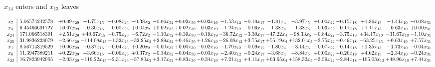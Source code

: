 \documentclass[9pt]{article}
\begin{document}
 $ x_{14} $ enters and $ x_{13} $ leaves 

 \[\begin{array}{c| c c@{\hskip 2pt} c@{\hskip 2pt} c@{\hskip 2pt} c@{\hskip 2pt} c@{\hskip 2pt} c@{\hskip 2pt} c@{\hskip 2pt} c@{\hskip 2pt} c@{\hskip 2pt} c@{\hskip 2pt} c@{\hskip 2pt} c@{\hskip 2pt} c@{\hskip 2pt} c@{\hskip 2pt} c@{\hskip 2pt} c@{\hskip 2pt} }
 x_{7}   &  5.06574242578 & +  0.09 x_{29} & +  1.75 x_{15} & -0.08 x_{26} & -0.38 x_{2} & -0.06 x_{32} & +  0.02 x_{30} & +  0.02 x_{19} & -1.53 x_{12} & -0.10 x_{17} & -1.81 x_{4} & -3.97 x_{5} & +  0.00 x_{22} & -0.15 x_{18} & +  1.86 x_{13} & -1.44 x_{10} & -0.08 x_{31}\\
 x_{3}   &  6.45466691727 & +  0.07 x_{29} & +  0.30 x_{15} & -0.00 x_{26} & +  0.04 x_{2} & +  0.02 x_{32} & +  0.02 x_{30} & -0.03 x_{19} & -1.24 x_{12} & -0.06 x_{17} & -1.38 x_{4} & -1.38 x_{5} & -0.03 x_{22} & -0.11 x_{18} & +  1.11 x_{13} & -0.63 x_{10} & +  0.00 x_{31}\\
 x_{24}   &  171.066518301 & +  2.51 x_{29} & + 40.67 x_{15} & -0.75 x_{26} & -6.72 x_{2} & -1.10 x_{32} & +  0.39 x_{30} & -0.19 x_{19} & -36.72 x_{12} & -3.30 x_{17} & -47.22 x_{4} & -98.33 x_{5} & -0.84 x_{22} & -3.75 x_{18} & + 34.17 x_{13} & -31.67 x_{10} & -1.10 x_{31}\\
 x_{25}   &  31.9836228079 & -2.66 x_{29} & -114.08 x_{15} & +  1.32 x_{26} & -32.25 x_{2} & +  2.89 x_{32} & +  0.46 x_{30} & +  1.26 x_{19} & -26.08 x_{12} & +  3.75 x_{17} & + 55.19 x_{4} & + 132.01 x_{5} & -3.75 x_{22} & +  0.49 x_{18} & -63.25 x_{13} & +  0.63 x_{10} & +  7.57 x_{31}\\
 x_{1}   &  8.56714319529 & +  0.06 x_{29} & +  0.37 x_{15} & -0.04 x_{26} & +  0.20 x_{2} & -0.00 x_{32} & +  0.00 x_{30} & -0.02 x_{19} & -1.79 x_{12} & -0.09 x_{17} & -1.80 x_{4} & -3.14 x_{5} & -0.07 x_{22} & -0.14 x_{18} & +  1.35 x_{13} & -1.73 x_{10} & -0.04 x_{31}\\
 x_{6}   &  11.3947389211 & +  0.22 x_{29} & +  3.66 x_{15} & -0.06 x_{26} & +  0.37 x_{2} & -0.14 x_{32} & -0.04 x_{30} & -0.03 x_{19} & -2.40 x_{12} & -0.24 x_{17} & -3.68 x_{4} & -8.84 x_{5} & +  0.00 x_{22} & -0.26 x_{18} & +  4.62 x_{13} & -2.34 x_{10} & -0.24 x_{31}\\
 x_{23}   &  16.7823942905 & -2.03 x_{29} & -116.22 x_{15} & +  2.31 x_{26} & -37.80 x_{2} & +  3.17 x_{32} & +  0.83 x_{30} & -0.34 x_{19} & +  7.21 x_{12} & +  4.11 x_{17} & + 63.65 x_{4} & + 158.32 x_{5} & -3.59 x_{22} & +  2.84 x_{18} & -105.03 x_{13} & + 48.96 x_{10} & +  7.44 x_{31}\\

\end{array}\]
\end{document}

